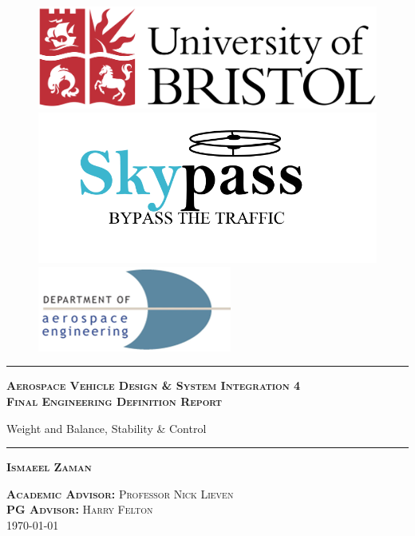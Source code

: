\documentclass[11pt,a4paper]{article}
\begin{document}
\begin{titlepage}

\begin{figure}[!htb]
  \includegraphics[width=.75\linewidth]{University_of_Bristol_logo.png}
  \endminipage\hfill
  \centering
    \includegraphics[width=.75\linewidth]{Logo.png}
    \endminipage\hfill
    \hspace{12mm}
      \includegraphics[width=.75\linewidth]{Aero_logo.png}
      \endminipage
      \end{figure}

\center 
\hrule
\textsc{\Large \textbf{Aerospace Vehicle Design \& System Integration 4 \\ \vspace{2mm} Final Engineering Definition Report}}

{ \large  Weight and Balance, Stability \& Control }
\vspace{6pt}
\hrule

\textsc{\textbf{Ismaeel Zaman}} 


\textsc{\textbf{Academic Advisor:} Professor Nick Lieven} \\
\textsc{\textbf{PG Advisor:} Harry Felton}
\\[0.5cm]
\textsc{\large \today} 
\vspace{6pt}


\end{titlepage}
\end{document}
